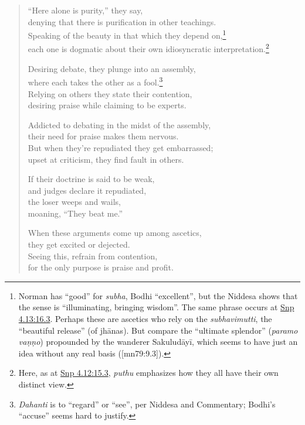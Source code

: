\documentclass[12pt,openany]{book}%
\begin{document}
\begin{verse}%
“Here alone is purity,” they say, \\
denying that there is purification in other teachings. \\
Speaking of the beauty in that which they depend on,\footnote{Norman has “good” for \textit{subha}, Bodhi “excellent”, but the Niddesa shows that the sense is “illuminating, bringing wisdom”. The same phrase occurs at \href{https://suttacentral.net/snp4.13/en/sujato\#16.3}{Snp 4.13:16.3}. Perhaps these are ascetics who rely on the \textit{subhavimutti}, the “beautiful release” (of \textsanskrit{jhānas}). But compare the “ultimate splendor” (\textit{paramo \textsanskrit{vaṇṇo}}) propounded by the wanderer \textsanskrit{Sakuludāyī}, which seems to have just an idea without any real basis ([mn79:9.3]). } \\
each one is dogmatic about their own idiosyncratic interpretation.\footnote{Here, as at \href{https://suttacentral.net/snp4.12/en/sujato\#15.3}{Snp 4.12:15.3}, \textit{puthu} emphasizes how they all have their own distinct view. } 

Desiring debate, they plunge into an assembly, \\
where each takes the other as a fool.\footnote{\textit{Dahanti} is to “regard” or “see”, per Niddesa and Commentary; Bodhi’s “accuse” seems hard to justify. } \\
Relying on others they state their contention, \\
desiring praise while claiming to be experts. 

Addicted to debating in the midst of the assembly, \\
their need for praise makes them nervous. \\
But when they’re repudiated they get embarrassed; \\
upset at criticism, they find fault in others. 

If their doctrine is said to be weak, \\
and judges declare it repudiated, \\
the loser weeps and wails, \\
moaning, “They beat me.” 

When these arguments come up among ascetics, \\
they get excited or dejected. \\
Seeing this, refrain from contention, \\
for the only purpose is praise and profit. 


\end{verse}
\end{document}
